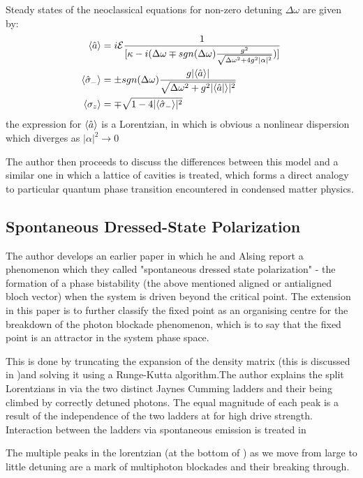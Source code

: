 Steady states of the neoclassical equations for non-zero detuning $\Delta \omega$ are given by:
\begin{align}
	\langle \hat{a} \rangle& = i \mathcal{E}\frac{1}{[\kappa-i(\Delta \omega \mp sgn(\Delta \omega) \frac{g^2}{\sqrt{\Delta \omega^2 +4g^2 |\alpha|^2}})]} \\
	\langle \hat{\sigma}_- \rangle& = \pm sgn(\Delta \omega) \frac{g |\langle \hat{a} \rangle|}{\sqrt{\Delta \omega^2 + g^2 |\langle \hat{a}| \rangle|^2}}\\
	\langle \sigma_z \rangle& = \mp \sqrt{1-4|\langle \hat{\sigma}_- \rangle|^2}
\end{align}
the expression for $\langle \hat{a} \rangle$ is a Lorentzian, in which is obvious a nonlinear dispersion which diverges as $|\alpha|^2 \rightarrow 0$

The author then proceeds to discuss the differences between this model and a similar one in which a lattice of cavities is treated, which forms a direct analogy to particular quantum phase transition encountered in condensed matter physics.

\subsection{Spontaneous Dressed-State Polarization}

The author develops an earlier paper \autocite{Alsing1999} in which he and Alsing report a phenomenon which they called "spontaneous dressed state polarization" - the formation of a phase bistability (the above mentioned aligned or antialigned bloch vector) when the system is driven beyond the critical point. The extension in this paper is to further classify the fixed point as an organising centre for the breakdown of the photon blockade phenomenon, which is to say that the fixed point is an attractor in the system phase space. 

This is done by truncating the expansion of the density matrix (this is discussed in \autocite{Savage1988})and solving it using a Runge-Kutta algorithm.The author explains the split Lorentzians in \autocite[Figure 1]{Carmichael2015} via the two distinct Jaynes Cumming ladders and their being climbed by correctly detuned photons. The equal magnitude of each peak is a result of the independence of the two ladders at for high drive strength. Interaction between the ladders via spontaneous emission is treated in \autocite[Section V]{Carmichael2015}

The multiple peaks in the lorentzian (at the bottom of \autocite[Figure 1]{Carmichael2015}) as we move from large to little detuning are a mark of multiphoton blockades and their breaking through.


